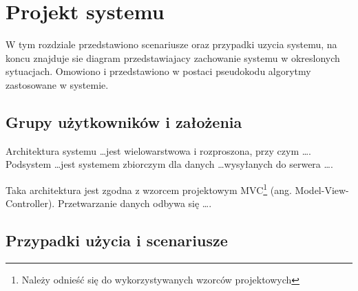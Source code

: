 \chapter{Projekt systemu}
\thispagestyle{chapterBeginStyle}
W tym rozdziale przedstawiono scenariusze oraz przypadki uzycia systemu, na koncu znajduje sie diagram przedstawiajacy zachowanie systemu w okreslonych sytuacjach. Omowiono i przedstawiono w postaci pseudokodu algorytmy zastosowane w systemie. 

\section{Grupy użytkowników i założenia}

{\color{dgray}
Architektura systemu \ldots jest wielowarstwowa i rozproszona, przy czym \ldots. Podsystem  \ldots jest systemem zbiorczym dla danych \ldots wysyłanych do serwera \ldots. 

Taka architektura jest zgodna z wzorcem projektowym MVC\footnote{Należy odnieść się do wykorzystywanych wzorców projektowych} (ang.  Model-View-Controller). Przetwarzanie danych odbywa się \ldots.
} 

\section{Przypadki użycia i scenariusze}
